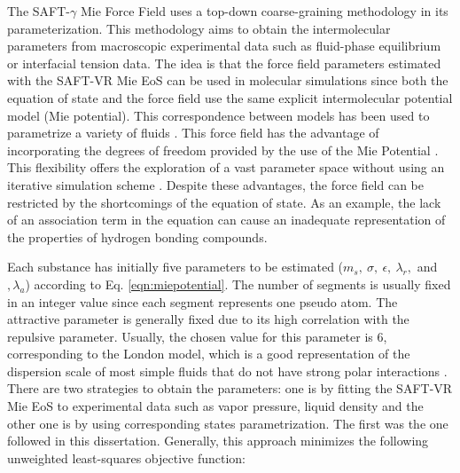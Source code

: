 The SAFT-$\gamma$ Mie Force Field uses a top-down coarse-graining methodology in its parameterization. This methodology aims to obtain the intermolecular parameters from macroscopic experimental data such as fluid-phase equilibrium or interfacial tension data. The idea is that the force field parameters estimated with the SAFT-VR Mie EoS can be used in molecular simulations since both the equation of state and the force field use the same explicit intermolecular potential model (Mie potential). This correspondence between models has been used to parametrize a variety of fluids \cite{ervik2016}. This force field has the advantage of incorporating the degrees of freedom provided by the use of the Mie Potential \cite{herdes2015}. This flexibility offers the exploration of a vast parameter space without using an iterative simulation scheme \cite{avendano2011}. Despite these advantages, the force field can be restricted by the shortcomings of the equation of state. As an example, the lack of an association term in the equation can cause an inadequate representation of the properties of hydrogen bonding compounds.

Each substance has initially five parameters to be estimated ($m_s,\ \sigma,\ \epsilon,\ \lambda_{r},$ and $, \lambda_{a}$) according to Eq. \eqref{eqn:miepotential}. The number of segments is usually fixed in an integer value since each segment represents one pseudo atom. The attractive parameter is generally  fixed due to its  high correlation with the repulsive parameter. Usually, the chosen value for this parameter is 6, corresponding to the London model, which is a good representation of the dispersion scale of most simple fluids that do not have strong polar interactions \cite{ramrattan2015,herdes2015}. There are two strategies to obtain the parameters: one is by fitting the SAFT-VR Mie EoS to experimental data such as vapor pressure, liquid density and the other one is by using corresponding states parametrization. The first was the one followed in this dissertation. Generally, this approach minimizes the following unweighted least-squares objective function:

